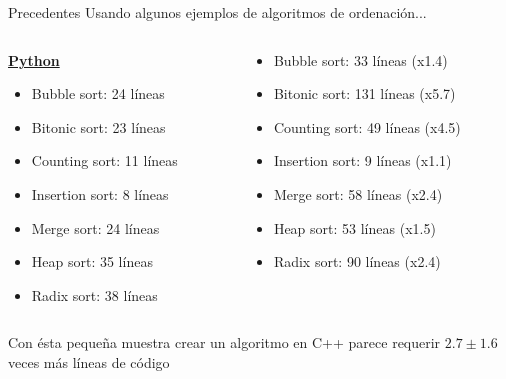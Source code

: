 \begin{frame}{Precedentes}
Usando algunos ejemplos de algoritmos de ordenación...

\vspace{0.5cm}
\begin{columns}
  \begin{column}{0.5\textwidth}
    \textbf{\underline{Python}}
    \begin{itemize}
        \item Bubble sort: 24 líneas
        \item Bitonic sort: 23 líneas
        \item Counting sort: 11 líneas
        \item Insertion sort: 8 líneas
        \item Merge sort: 24 líneas
        \item Heap sort: 35 líneas
        \item Radix sort: 38 líneas
    \end{itemize}
  \end{column}

  \begin{column}{0.5\textwidth}
    \textbf{\underline{\CC}}
    \begin{itemize}
        \item Bubble sort: 33 líneas (x1.4)
        \item Bitonic sort: 131 líneas (x5.7)
        \item Counting sort: 49 líneas (x4.5)
        \item Insertion sort: 9 líneas (x1.1)
        \item Merge sort: 58 líneas (x2.4)
        \item Heap sort: 53 líneas (x1.5)
        \item Radix sort: 90 líneas (x2.4)
    \end{itemize}
  \end{column}
\end{columns}

\vspace{0.5cm}
Con ésta pequeña muestra crear un algoritmo en C++ parece requerir
$2.7 \pm 1.6$ veces más líneas de código

\end{frame}

